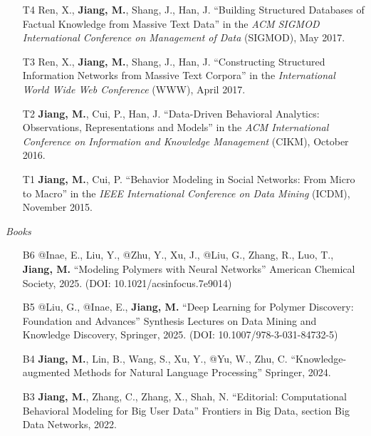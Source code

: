 \documentclass[10pt]{article}
\newenvironment{myindentpar}[1]%
{\begin{list}{}%
         {\setlength{\leftmargin}{#1}}%
         \item[]%
}
{\end{list}}
\newcounter{list}
\begin{document}
\begin{myindentpar}{0.00cm}
\begin{enumerate}[leftmargin=.5cm]
\item[T4] Ren, X., \textbf{Jiang, M.}, Shang, J., Han, J. ``Building Structured Databases of Factual Knowledge from Massive Text Data'' in the \textit{ACM SIGMOD International Conference on Management of Data} (SIGMOD), May 2017.
		
\item[T3] Ren, X., \textbf{Jiang, M.}, Shang, J., Han, J. ``Constructing Structured Information Networks from Massive Text Corpora'' in the \textit{International World Wide Web Conference}  (WWW), April 2017.

\item[T2] \textbf{Jiang, M.}, Cui, P., Han, J. ``Data-Driven Behavioral Analytics: Observations, Representations and Models'' in the \textit{ACM International Conference on Information and Knowledge Management} (CIKM), October 2016.
		
\item[T1] \textbf{Jiang, M.}, Cui, P. ``Behavior Modeling in Social Networks: From Micro to Macro'' in the \textit{IEEE International Conference on Data Mining} (ICDM), November 2015.

\end{enumerate}

\hspace{-0.25cm}\textit{Books}

\begin{enumerate}[leftmargin=.5cm]

\item[B6] @Inae, E., Liu, Y., @Zhu, Y., Xu, J., @Liu, G., Zhang, R., Luo, T., \textbf{Jiang, M.} ``Modeling Polymers with Neural Networks'' American Chemical Society, 2025. (DOI: 10.1021/acsinfocus.7e9014)

\item[B5] @Liu, G., @Inae, E., \textbf{Jiang, M.} ``Deep Learning for Polymer Discovery: Foundation and Advances'' Synthesis Lectures on Data Mining and Knowledge Discovery, Springer, 2025. (DOI: 10.1007/978-3-031-84732-5)
		
\item[B4] \textbf{Jiang, M.}, Lin, B., Wang, S., Xu, Y., @Yu, W., Zhu, C. ``Knowledge-augmented Methods for Natural Language Processing'' Springer, 2024.

\item[B3] \textbf{Jiang, M.}, Zhang, C., Zhang, X., Shah, N. ``Editorial: Computational Behavioral Modeling for Big User Data'' Frontiers in Big Data, section Big Data Networks, 2022.
		

\end{enumerate}
\end{myindentpar}
\end{document}
